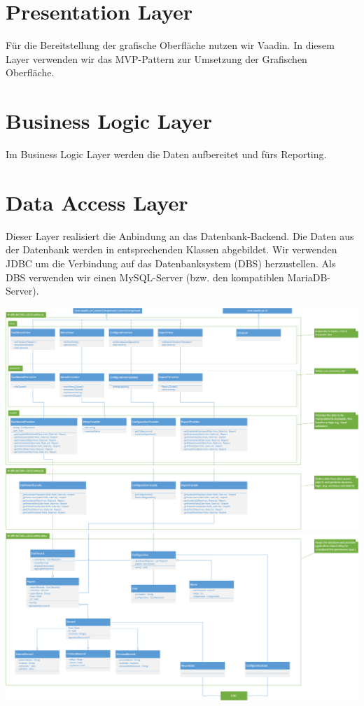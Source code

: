 \documentclass[a4paper]{scrreprt}
\begin{document}
\section{Presentation Layer}
Für die Bereitstellung der grafische Oberfläche nutzen wir Vaadin. In diesem Layer verwenden wir das MVP-Pattern zur Umsetzung der Grafischen Oberfläche.



\section{Business Logic Layer}
Im Business Logic Layer werden die Daten aufbereitet und fürs Reporting.


\section{Data Access Layer}
Dieser Layer realisiert die Anbindung an das Datenbank-Backend. Die Daten aus der Datenbank werden in entsprechenden Klassen abgebildet.
Wir verwenden JDBC um die Verbindung auf das Datenbanksystem (DBS) herzustellen. Als DBS verwenden wir einen MySQL-Server (bzw. den kompatiblen MariaDB-Server).



\pagebreak

\includegraphics[width=1\textwidth]{img/architecture_overview_1.png}
\includegraphics[width=1\textwidth]{img/architecture_overview_2.png}
\includegraphics[width=1\textwidth]{img/architecture_overview_3.png}
\end{document}
